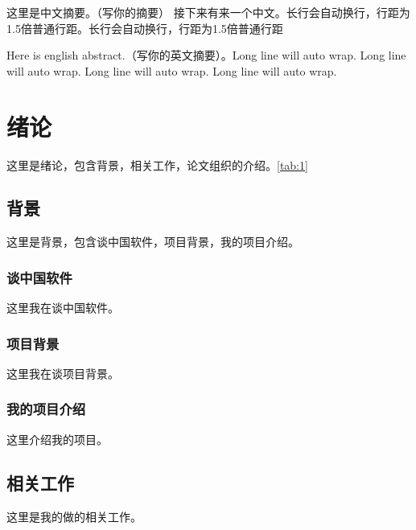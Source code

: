 \documentclass[a4paper]{ecnuthesis}
\begin{document}

\thesistitlepage
\thesiscontents

\begin{thesisabstractchinese}
这里是中文摘要。（写你的摘要）
接下来有来一个中文。长行会自动换行，行距为1.5倍普通行距。长行会自动换行，行距为1.5倍普通行距
\end{thesisabstractchinese}

\begin{thesisabstractenglish}
Here is english abstract.（写你的英文摘要）。Long line will auto wrap. Long line will auto wrap. Long line will auto wrap. Long line will auto wrap.
\end{thesisabstractenglish}

\section{绪论}
这里是绪论，包含背景，相关工作，论文组织的介绍。\ref{tab:1}

\subsection{背景}
这里是背景，包含谈中国软件，项目背景，我的项目介绍。

\subsubsection{谈中国软件}
这里我在谈中国软件。

\subsubsection{项目背景}
这里我在谈项目背景。

\subsubsection{我的项目介绍}
这里介绍我的项目。

\subsection{相关工作}
这里是我的做的相关工作。
\end{document}
